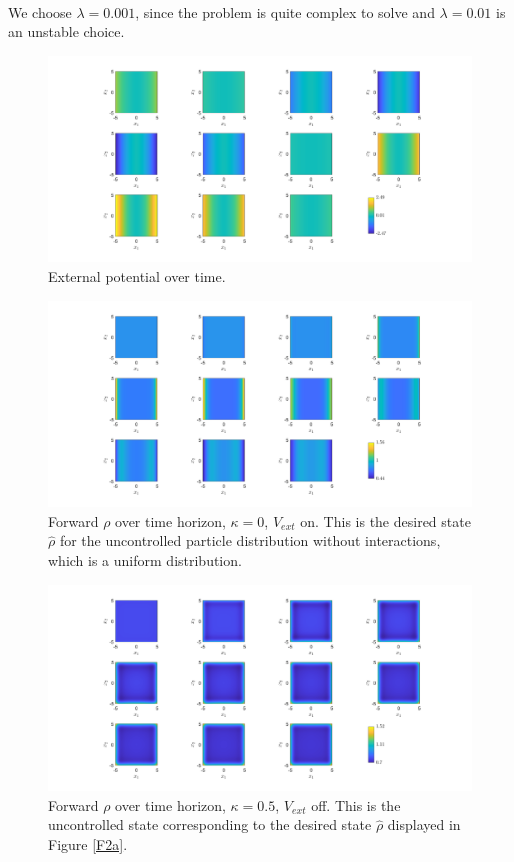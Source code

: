 \documentclass[11pt, a4paper]{article}
\theoremstyle{definition}
\newcommand{\hr}{\widehat \rho}
\begin{document}
\\
We choose $\lambda = 0.001$, since the problem is quite complex to solve and $\lambda = 0.01$ is an unstable choice.
\begin{figure}[h]
	\centering
	\includegraphics[scale=0.35]{Vext.png}
	\caption{External potential over time.} 
	\label{F1}
\end{figure}
\begin{figure}[h]
	\centering
	\includegraphics[scale=0.35]{rhok0V.png}
	\caption{Forward $\rho$ over time horizon, $\kappa = 0$, $V_{ext}$ on. This is the desired state $\hr$ for the uncontrolled particle distribution without interactions, which is a uniform distribution.} 
	\label{F0c}
\end{figure}
\begin{figure}[h]
	\centering
	\includegraphics[scale=0.35]{rhok05.png}
	\caption{Forward $\rho$ over time horizon, $\kappa = 0.5$, $V_{ext}$ off. This is the uncontrolled state corresponding to the desired state $\hr$ displayed in Figure \ref{F2a}.} 
	\label{F0a}
\end{figure}
\end{document}
